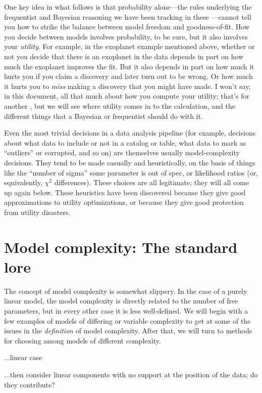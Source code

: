 \documentclass[12pt,twoside]{article}
\begin{document}
One key idea in what follows is that probability alone---the rules
underlying the frequentist and Bayesian reasoning we have been
tracking in these \documentnames ---cannot tell you how to strike the
balance between model freedom and goodness-of-fit.  How you decide
between models involves probability, to be sure, but it also involves
your \emph{utility}.  For example, in the exoplanet example mentioned
above, whether or not you decide that there is an exoplanet in the
data depends in part on how much the exoplanet improves the fit.  But
it also depends in part on how much it hurts you if you claim a
discovery and later turn out to be wrong.  Or how much it hurts you to
\emph{miss} making a discovery that you might have made.  I won't say,
in this document, all that much about how you compute your utility;
that's for another \documentname{},
but we will see where utility comes in to the calculation, and the
different things that a Bayesian or frequentist should do with it.

Even the most trivial decisions in a data analysis pipeline (for
example, decisions about what data to include or not in a catalog or
table, what data to mark as ``outliers'' or corrupted, and so on) are
themselves usually model-complexity decisions.  They tend to be made
casually and heuristically, on the basis of things like the ``number
of sigma'' some parameter is out of spec, or likelihood ratios (or,
equivalently, $\chi^2$ differences).  These choices are all
legitimate; they will all come up again below.  These heuristics have
been discovered because they give good approximations to utility
optimizations, or because they give good protection from utility
disasters.

\section{Model complexity: The standard lore}

The concept of model complexity is somewhat slippery.  In the case of
a purely linear model, the model complexity is directly related to the
number of free parameters, but in every other case it is less
well-defined.  We will begin with a few examples of models of
differing or variable complexity to get at some of the issues in the
\emph{definition} of model complexity.  After that, we will turn to
methods for choosing among models of different complexity.

...linear case

...then consider linear components with no support at the position of the
data; do they contribute?
\end{document}

